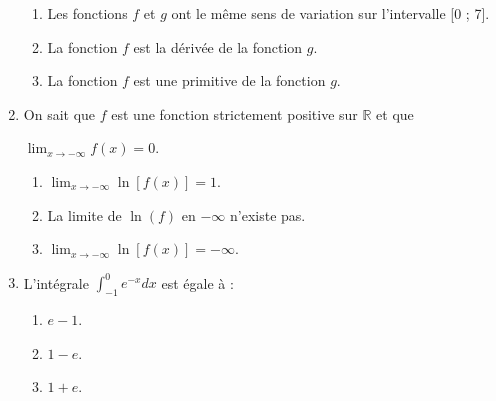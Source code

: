 \begin{enumerate}
     \begin{enumerate}[label=\alph*.]
          \item
          Les fonctions $f$ et $g$ ont le même sens de variation sur l'intervalle [0 ; 7].
          \item
          La fonction $f$ est la dérivée de la fonction $g$.
          \item
          La fonction $f$ est une primitive de la fonction $g$.
     \end{enumerate}
     \item
     On sait que $f$ est une fonction strictement positive sur $\mathbb{R}$ et que
     \par
     $ \lim_{x \rightarrow -\infty } f\left(x\right) = 0$.
     \begin{enumerate}[label=\alph*.]
          \item
          $ \lim_{x \rightarrow -\infty }  \ln \left[f\left(x\right)\right] = 1$.
          \item
          La limite de $\ln\left(f\right)$ en $-\infty $ n'existe pas.
          \item
          $ \lim_{x \rightarrow  -\infty }  \ln \left[f\left(x\right)\right] = -\infty $.
     \end{enumerate}
     \item
     L'intégrale $ \int_{-1}^{0} e^{-x}dx$ est égale à :
     \begin{enumerate}[label=\alph*.]
          \item
          $e-1$.
          \item
          $1-e$.
          \item
          $1 + e$.
     \end{enumerate}
\end{enumerate}
